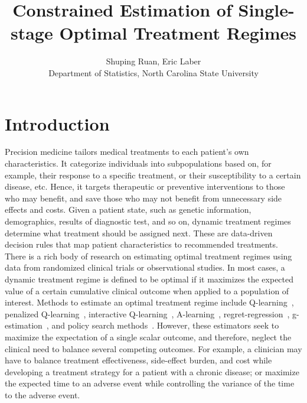 \documentclass{article}
\title{Constrained Estimation of Single-stage Optimal Treatment Regimes}
\author{Shuping Ruan, Eric Laber\\ Department of Statistics, North Carolina State University}
\begin{document}
\maketitle

\section{Introduction}
Precision medicine tailors medical treatments to each patient's own characteristics. It categorize individuals into subpopulations based on, for example, their response to a specific treatment, or their susceptibility to a certain disease, etc. Hence, it targets therapeutic or preventive interventions to those who may benefit, and save those who may not benefit from unnecessary side effects and costs. Given a patient state, such as genetic information, demographics, results of diagnostic test, and so on, dynamic treatment regimes determine what treatment should be assigned next. These are data-driven decision rules that map patient characteristics to recommended treatments. \\

There is a rich body of research on estimating optimal treatment regimes using data from randomized clinical trials or observational studies. In most cases, a dynamic treatment regime is defined to be optimal if it maximizes the expected value of a certain cumulative clinical outcome when applied to a population of interest. Methods to estimate an optimal treatment regime include Q-learning~\cite{Nahum2012}, penalized Q-learning~\cite{Song2011}, interactive Q-learning~\cite{Linn2014}, A-learning~\cite{Schulte2014}, regret-regression~\cite{henderson2010}, g-estimation~\cite{gestimation}, and policy search methods~\cite{Zhao2012,Zhao2015,Zhang2012,Zhang2012b,Orellana2010a,Zhao2012}. However, these estimators seek to maximize the expectation of a single scalar outcome, and therefore, neglect the clinical need to balance several competing outcomes. For example, a clinician may have to balance treatment effectiveness, side-effect burden, and cost while developing a treatment strategy for a patient with a chronic disease; or maximize the expected time to an adverse event while controlling the variance of the time to the adverse event.\\
\end{document}
